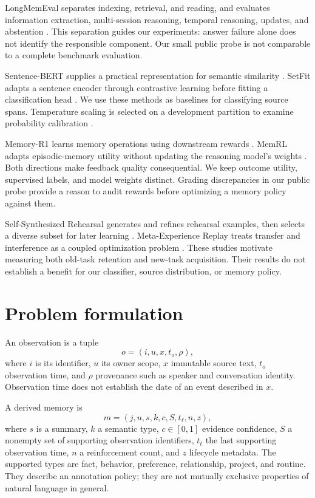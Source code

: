 \documentclass[11pt]{article}
\begin{document}
LongMemEval separates indexing, retrieval, and reading, and evaluates information extraction, multi-session reasoning, temporal reasoning, updates, and abstention \citep{longmem}. This separation guides our experiments: answer failure alone does not identify the responsible component. Our small public probe is not comparable to a complete benchmark evaluation.

Sentence-BERT supplies a practical representation for semantic similarity \citep{sbert}. SetFit adapts a sentence encoder through contrastive learning before fitting a classification head \citep{setfit}. We use these methods as baselines for classifying source spans. Temperature scaling is selected on a development partition to examine probability calibration \citep{calibration}.

Memory-R1 learns memory operations using downstream rewards \citep{memoryr1}. MemRL adapts episodic-memory utility without updating the reasoning model's weights \citep{memrl}. Both directions make feedback quality consequential. We keep outcome utility, supervised labels, and model weights distinct. Grading discrepancies in our public probe provide a reason to audit rewards before optimizing a memory policy against them.

Self-Synthesized Rehearsal generates and refines rehearsal examples, then selects a diverse subset for later learning \citep{ssr}. Meta-Experience Replay treats transfer and interference as a coupled optimization problem \citep{mer}. These studies motivate measuring both old-task retention and new-task acquisition. Their results do not establish a benefit for our classifier, source distribution, or memory policy.

\section{Problem formulation}
An observation is a tuple
\[
 o=(i,u,x,t_o,\rho),
\]
where $i$ is its identifier, $u$ its owner scope, $x$ immutable source text, $t_o$ observation time, and $\rho$ provenance such as speaker and conversation identity. Observation time does not establish the date of an event described in $x$.

A derived memory is
\[
 m=(j,u,s,k,c,S,t_\ell,n,z),
\]
where $s$ is a summary, $k$ a semantic type, $c\in[0,1]$ evidence confidence, $S$ a nonempty set of supporting observation identifiers, $t_\ell$ the last supporting observation time, $n$ a reinforcement count, and $z$ lifecycle metadata. The supported types are fact, behavior, preference, relationship, project, and routine. They describe an annotation policy; they are not mutually exclusive properties of natural language in general.
\end{document}
